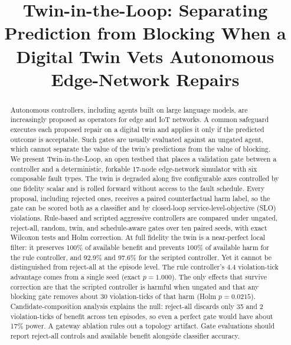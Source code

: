 \documentclass[conference]{IEEEtran}
\begin{document}
\title{Twin-in-the-Loop: Separating Prediction from Blocking When a Digital Twin Vets Autonomous Edge-Network Repairs}

\author{

}

\maketitle

\begin{abstract}
Autonomous controllers, including agents built on large language models, are increasingly proposed as operators for edge and IoT networks. A common safeguard executes each proposed repair on a digital twin and applies it only if the predicted outcome is acceptable. Such gates are usually evaluated against an ungated agent, which cannot separate the value of the twin's predictions from the value of blocking. We present Twin-in-the-Loop, an open testbed that places a validation gate between a controller and a deterministic, forkable 17-node edge-network simulator with six composable fault types. The twin is degraded along five configurable axes controlled by one fidelity scalar and is rolled forward without access to the fault schedule. Every proposal, including rejected ones, receives a paired counterfactual harm label, so the gate can be scored both as a classifier and by closed-loop service-level-objective (SLO) violations. Rule-based and scripted aggressive controllers are compared under ungated, reject-all, random, twin, and schedule-aware gates over ten paired seeds, with exact Wilcoxon tests and Holm correction. At full fidelity the twin is a near-perfect local filter: it preserves 100\% of available benefit and prevents 100\% of available harm for the rule controller, and 92.9\% and 97.6\% for the scripted controller. Yet it cannot be distinguished from reject-all at the episode level. The rule controller's 4.4 violation-tick advantage comes from a single seed (exact $p = 1.000$). The only effects that survive correction are that the scripted controller is harmful when ungated and that any blocking gate removes about 30 violation-ticks of that harm (Holm $p = 0.0215$). Candidate-composition analysis explains the null: reject-all discards only 35 and 2 violation-ticks of benefit across ten episodes, so even a perfect gate would have about 17\% power. A gateway ablation rules out a topology artifact. Gate evaluations should report reject-all controls and available benefit alongside classifier accuracy.
\end{abstract}
\end{document}
